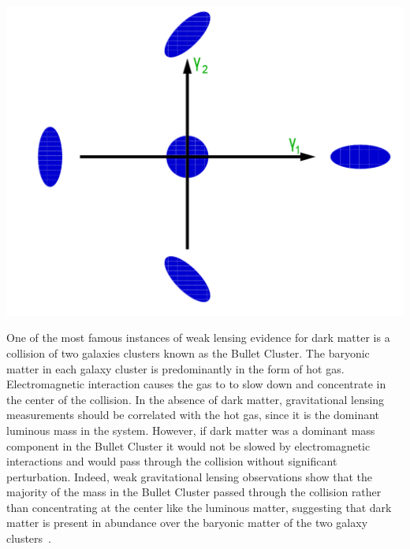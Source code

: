 \begin{center} \label{lensfigure}
\includegraphics[scale=0.3]{GammaOneGammaTwo.png}
\end{center}

 
One of the most famous instances of weak lensing evidence for dark matter is a collision of two galaxies clusters known as the Bullet Cluster.  The baryonic matter in each galaxy cluster is predominantly in the form of hot gas.  Electromagnetic interaction causes the gas to to slow down and concentrate in the center of the collision.  In the absence of dark matter, gravitational lensing measurements should be correlated with the hot gas, since it is the dominant luminous mass in the system.  However, if dark matter was a dominant mass component in the Bullet Cluster it would not be slowed by electromagnetic interactions and would pass through the collision without significant perturbation. Indeed, weak gravitational lensing observations show that the majority of the mass in the Bullet Cluster passed through the collision rather than concentrating at the center like the luminous matter, suggesting that dark matter is present in abundance over the baryonic matter of the two galaxy clusters~\cite{Clowe}.


